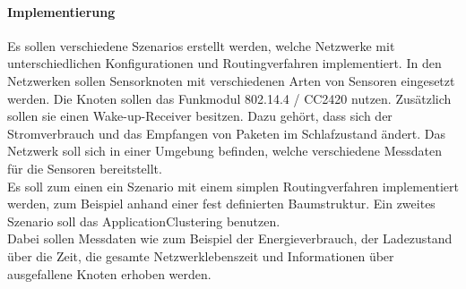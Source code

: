 \paragraph{Implementierung}
Es sollen verschiedene Szenarios erstellt werden, welche Netzwerke mit unterschiedlichen Konfigurationen und Routingverfahren implementiert. In den Netzwerken sollen Sensorknoten mit verschiedenen Arten von Sensoren eingesetzt werden. Die Knoten sollen das Funkmodul 802.14.4 / CC2420 nutzen. Zusätzlich sollen sie einen Wake-up-Receiver besitzen. Dazu gehört, dass sich der Stromverbrauch und das Empfangen von Paketen im Schlafzustand ändert. Das Netzwerk soll sich in einer Umgebung befinden, welche verschiedene Messdaten für die Sensoren bereitstellt.\\
Es soll zum einen ein Szenario mit einem simplen Routingverfahren implementiert werden, zum Beispiel anhand einer fest definierten Baumstruktur. Ein zweites Szenario soll das ApplicationClustering benutzen.\\
Dabei sollen Messdaten wie zum Beispiel der Energieverbrauch, der Ladezustand über die Zeit, die gesamte Netzwerklebenszeit und Informationen über ausgefallene Knoten erhoben werden.